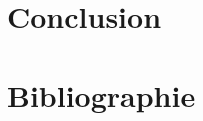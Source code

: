 \documentclass[11pt,a4paper,titlepage, oneside]{article}
\begin{document}
\newpage
\section{{\color{red}Conclusion}}
	

%		
%		
%		
%		
%
		



\newpage
\section{{\color{red}Bibliographie}}
\end{document}
